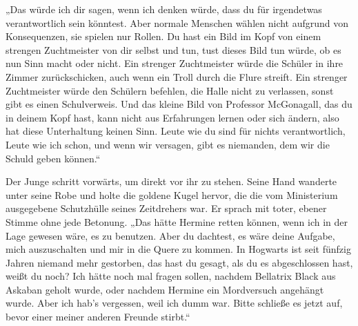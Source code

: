 „Das würde ich dir sagen, wenn ich denken würde, dass du für irgendetwas verantwortlich sein könntest. Aber normale Menschen wählen nicht aufgrund von Konsequenzen, sie spielen nur Rollen. Du hast ein Bild im Kopf von einem strengen Zuchtmeister von dir selbst und tun, tust dieses Bild tun würde, ob es nun Sinn macht oder nicht. Ein strenger Zuchtmeister würde die Schüler in ihre Zimmer zurückschicken, auch wenn ein Troll durch die Flure streift. Ein strenger Zuchtmeister würde den Schülern befehlen, die Halle nicht zu verlassen, sonst gibt es einen Schulverweis. Und das kleine Bild von Professor McGonagall, das du in deinem Kopf hast, kann nicht aus Erfahrungen lernen oder sich ändern, also hat diese Unterhaltung keinen Sinn. Leute wie du sind für nichts verantwortlich, Leute wie ich schon, und wenn wir versagen, gibt es niemanden, dem wir die Schuld geben können.“

Der Junge schritt vorwärts, um direkt vor ihr zu stehen. Seine Hand wanderte unter seine Robe und holte die goldene Kugel hervor, die die vom Ministerium ausgegebene Schutzhülle seines Zeitdrehers war. Er sprach mit toter, ebener Stimme ohne jede Betonung. „Das hätte Hermine retten können, wenn ich in der Lage gewesen wäre, es zu benutzen. Aber du dachtest, es wäre deine Aufgabe, mich auszuschalten und mir in die Quere zu kommen. In Hogwarts ist seit fünfzig Jahren niemand mehr gestorben, das hast du gesagt, als du es abgeschlossen hast, weißt du noch? Ich hätte noch mal fragen sollen, nachdem Bellatrix Black aus Askaban geholt wurde, oder nachdem Hermine ein Mordversuch angehängt wurde. Aber ich hab’s vergessen, weil ich dumm war. Bitte schließe es jetzt auf, bevor einer meiner anderen Freunde stirbt.“


